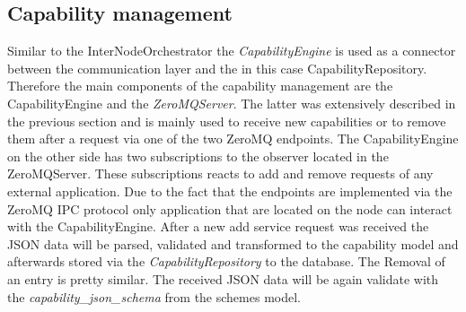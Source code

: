 \subsection{Capability management}
Similar to the InterNodeOrchestrator the \textit{CapabilityEngine} is used as a connector between the communication layer and the in this case CapabilityRepository.
Therefore the main components of the capability management are the CapabilityEngine and the \textit{ZeroMQServer}.
The latter was extensively described in the previous section and is mainly used to receive new capabilities or to remove them after a request via one of the two ZeroMQ endpoints.
The CapabilityEngine on the other side has two subscriptions to the observer located in the ZeroMQServer.
These subscriptions reacts to add and remove requests of any external application.
Due to the fact that the endpoints are implemented via the ZeroMQ \ac{IPC} protocol only application that are located on the node can interact with the CapabilityEngine.
After a new add service request was received the \ac{JSON} data will be parsed, validated and transformed to the capability model and afterwards stored via the \textit{CapabilityRepository} to the database.
The Removal of an entry is pretty similar.
The received \ac{JSON} data will be again validate with the \textit{capability\_json\_schema} from the schemes model.


